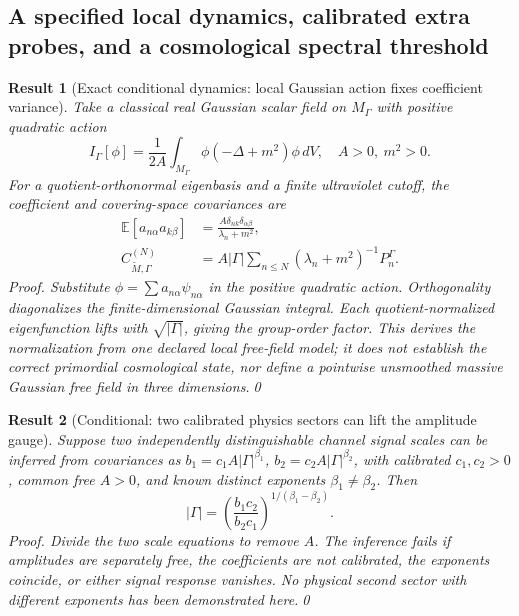 \documentclass[aps,prd,onecolumn,notitlepage,groupedaddress,11pt]{revtex4-2}
\newtheorem{result}{Result}
\begin{document}
\subsection{A specified local dynamics, calibrated extra probes, and a cosmological spectral threshold}
\begin{result}[\textsf{Exact conditional dynamics}: local Gaussian action fixes coefficient variance]\label{new:153}
Take a \emph{classical} real Gaussian scalar field on \(M_\Gamma\) with positive quadratic action
\begin{equation}\label{new:eq153}
I_\Gamma[\phi]=\frac1{2A}\int_{M_\Gamma}\phi(-\Delta+m^2)\phi\,dV,\quad A>0,\ m^2>0.
\end{equation}
For a quotient-orthonormal eigenbasis and a finite ultraviolet cutoff, the coefficient and covering-space covariances are
\begin{align}\label{new:local-action-covariance}
\mathbb E[a_{n\alpha}a_{k\beta}]&=\frac{A\delta_{nk}\delta_{\alpha\beta}}{\lambda_n+m^2},\\
C_{\widetilde M,\Gamma}^{(N)}&=A|\Gamma|\sum_{n\le N}(\lambda_n+m^2)^{-1}P_n^\Gamma.
\end{align}
\textit{Proof.} Substitute \(\phi=\sum a_{n\alpha}\psi_{n\alpha}\) in the positive quadratic action. Orthogonality diagonalizes the finite-dimensional Gaussian integral. Each quotient-normalized eigenfunction lifts with \(\sqrt{|\Gamma|}\), giving the group-order factor. This \emph{derives} the normalization from one declared local free-field model; it does not establish the correct primordial cosmological state, nor define a pointwise unsmoothed massive Gaussian free field in three dimensions.\qed
\end{result}
\begin{result}[\textsf{Conditional}: two calibrated physics sectors can lift the amplitude gauge]\label{new:154}
Suppose two independently distinguishable channel signal scales can be inferred from covariances as \(b_1=c_1 A |\Gamma|^{\beta_1}\), \(b_2=c_2 A|\Gamma|^{\beta_2}\), with calibrated \(c_1,c_2>0\), common free \(A>0\), and known distinct exponents \(\beta_1\ne\beta_2\). Then
\begin{equation}\label{new:eq154}
|\Gamma|=\left(\frac{b_1c_2}{b_2c_1}\right)^{1/(\beta_1-\beta_2)}.
\end{equation}
\textit{Proof.} Divide the two scale equations to remove \(A\). The inference fails if amplitudes are separately free, the coefficients are not calibrated, the exponents coincide, or either signal response vanishes. No physical second sector with different exponents has been demonstrated here.\qed
\end{result}
\end{document}

